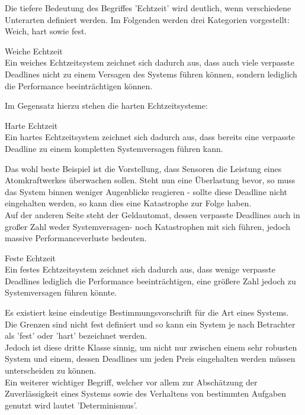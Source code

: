 Die tiefere Bedeutung des Begriffes 'Echtzeit' wird deutlich, wenn verschiedene Unterarten definiert werden. Im Folgenden werden drei Kategorien vorgestellt: Weich, hart sowie fest.\\
\begin{definition}{Weiche Echtzeit}\\
Ein weiches Echtzeitsystem zeichnet sich dadurch aus, dass auch viele verpasste Deadlines nicht zu einem Versagen des Systems führen können, sondern lediglich die Performance beeinträchtigen können.
\end{definition}
Im Gegensatz hierzu stehen die harten Echtzeitsysteme:\\
\begin{definition}{Harte Echtzeit}\\
Ein hartes Echtzeitsystem zeichnet sich dadurch aus, dass bereits eine verpasste Deadline zu einem kompletten Systemversagen führen kann.
\end{definition}
Das wohl beste Beispiel ist die Vorstellung, dass Sensoren die Leistung eines Atomkraftwerkes überwachen sollen. Steht nun eine Überlastung bevor, so muss das System binnen weniger Augenblicke reagieren - sollte diese Deadline nicht eingehalten werden, so kann dies eine Katastrophe zur Folge haben.\\
Auf der anderen Seite steht der Geldautomat, dessen verpasste Deadlines auch in großer Zahl weder Systemversagen- noch Katastrophen mit sich führen, jedoch massive Performanceverluste bedeuten.\\
\begin{definition}{Feste Echtzeit}\\
Ein festes Echtzeitsystem zeichnet sich dadurch aus, dass wenige verpasste Deadlines lediglich die Performance beeinträchtigen, eine größere Zahl jedoch zu Systemversagen führen könnte.
\end{definition}
Es existiert keine eindeutige Bestimmungsvorschrift für die Art eines Systems. Die Grenzen sind nicht fest definiert und so kann ein System je nach Betrachter als 'fest' oder 'hart' bezeichnet werden.\\
Jedoch ist diese dritte Klasse sinnig, um nicht nur zwischen einem sehr robusten System und einem,
dessen Deadlines um jeden Preis eingehalten werden müssen unterscheiden zu können.\\
Ein weiterer wichtiger Begriff, welcher vor allem zur Abschätzung der Zuverlässigkeit eines Systems sowie des Verhaltens von bestimmten Aufgaben genutzt wird lautet 'Determinismus'.\\
